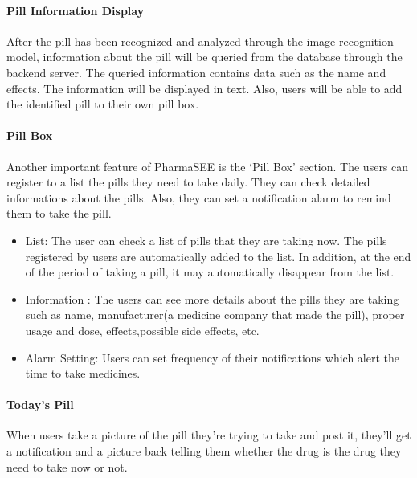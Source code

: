 \documentclass[conference]{IEEEtran}
\begin{document}
\paragraph{Pill Information Display}After the pill has been recognized and analyzed through the image recognition model, information about the pill will be queried from the database through the backend server. The queried information contains data such as the name and effects. The information will be displayed in text. Also, users will be able to add the identified pill to their own pill box.\\

\paragraph{Pill Box}Another important feature of PharmaSEE is the ‘Pill Box’ section. The users can register to a list the pills they need to take daily. They can check detailed informations about the pills. Also, they can set a notification alarm to remind them to take the pill.\\

\begin{itemize}

\item List: The user can check a list of pills that they are taking now. The pills registered by users are automatically added to the list. In addition, at the end of the period of taking a pill, it may automatically disappear from the list.\\ 

\item Information : The users can see more details about the pills they are taking such as name, manufacturer(a medicine company that made the pill), proper usage and dose, effects,possible side effects, etc.\\

\item Alarm Setting: Users can set frequency of their notifications which alert the time to take medicines.\\
\end{itemize}

\paragraph{Today's Pill}
When users take a picture of the pill they're trying to take and post it, they'll get a notification and a picture back telling them whether the drug is the drug they need to take now or not.\\
\end{document}
